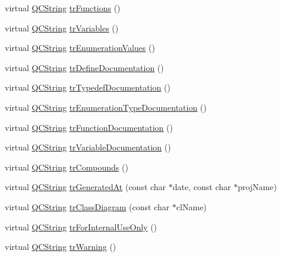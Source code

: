 \begin{DoxyCompactItemize}
\item 
virtual \hyperlink{class_q_c_string}{Q\+C\+String} \hyperlink{class_translator_serbian_cyrillic_a1f0b8b32aaed2270bf454c4ee6c27e39}{tr\+Functions} ()
\item 
virtual \hyperlink{class_q_c_string}{Q\+C\+String} \hyperlink{class_translator_serbian_cyrillic_a5114b32a6afc596463b20c2aaf04f530}{tr\+Variables} ()
\item 
virtual \hyperlink{class_q_c_string}{Q\+C\+String} \hyperlink{class_translator_serbian_cyrillic_a85bb90af627cf0c401b6660fa21510ce}{tr\+Enumeration\+Values} ()
\item 
virtual \hyperlink{class_q_c_string}{Q\+C\+String} \hyperlink{class_translator_serbian_cyrillic_a8fb5969803e5ab5bfeddcd9400e83c2c}{tr\+Define\+Documentation} ()
\item 
virtual \hyperlink{class_q_c_string}{Q\+C\+String} \hyperlink{class_translator_serbian_cyrillic_a20b95cb23623637834459e27a3a47fdc}{tr\+Typedef\+Documentation} ()
\item 
virtual \hyperlink{class_q_c_string}{Q\+C\+String} \hyperlink{class_translator_serbian_cyrillic_a84a8e172afd5948ae3e9d945b86c54ef}{tr\+Enumeration\+Type\+Documentation} ()
\item 
virtual \hyperlink{class_q_c_string}{Q\+C\+String} \hyperlink{class_translator_serbian_cyrillic_a1da3a2e14b6aff18ef2f76e97cf3d685}{tr\+Function\+Documentation} ()
\item 
virtual \hyperlink{class_q_c_string}{Q\+C\+String} \hyperlink{class_translator_serbian_cyrillic_a3efb02fc5cfd12aa212de984f3ddb59b}{tr\+Variable\+Documentation} ()
\item 
virtual \hyperlink{class_q_c_string}{Q\+C\+String} \hyperlink{class_translator_serbian_cyrillic_a2e7125c02a430c5e9a401e162108992f}{tr\+Compounds} ()
\item 
virtual \hyperlink{class_q_c_string}{Q\+C\+String} \hyperlink{class_translator_serbian_cyrillic_af449db58ef00e66120ddcac512f30078}{tr\+Generated\+At} (const char $\ast$date, const char $\ast$proj\+Name)
\item 
virtual \hyperlink{class_q_c_string}{Q\+C\+String} \hyperlink{class_translator_serbian_cyrillic_aab6b73d32b61e27327a6846883dfd197}{tr\+Class\+Diagram} (const char $\ast$cl\+Name)
\item 
virtual \hyperlink{class_q_c_string}{Q\+C\+String} \hyperlink{class_translator_serbian_cyrillic_a9e6b78807c432fc6d083d68b48b3e8b0}{tr\+For\+Internal\+Use\+Only} ()
\item 
virtual \hyperlink{class_q_c_string}{Q\+C\+String} \hyperlink{class_translator_serbian_cyrillic_a80540cd63d9d8d3d947b6eef8846f680}{tr\+Warning} ()

\end{DoxyCompactItemize}
